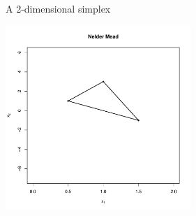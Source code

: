 \documentclass[10pt]{beamer}
\begin{document}
                                                                                              \begin{frame}{A 2-dimensional simplex}
                                                                                                \begin{center}
                                                                                                  \includegraphics[height=7cm]{RCode/nm0.pdf}
                                                                                                \end{center}
                                                                                              \end{frame}
\end{document}
